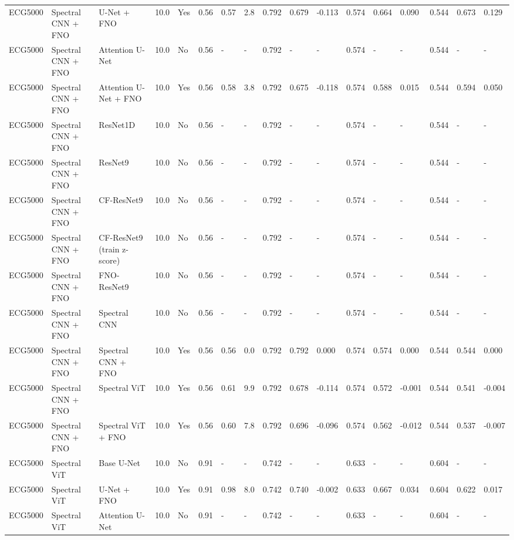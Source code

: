 \begin{longtable}{lllllllllllllllll}
ECG5000 & Spectral CNN + FNO & U-Net + FNO & 10.0 & Yes & 0.56 & 0.57 & 2.8 & 0.792 & 0.679 & -0.113 & 0.574 & 0.664 & 0.090 & 0.544 & 0.673 & 0.129 \\
ECG5000 & Spectral CNN + FNO & Attention U-Net & 10.0 & No & 0.56 & - & - & 0.792 & - & - & 0.574 & - & - & 0.544 & - & - \\
ECG5000 & Spectral CNN + FNO & Attention U-Net + FNO & 10.0 & Yes & 0.56 & 0.58 & 3.8 & 0.792 & 0.675 & -0.118 & 0.574 & 0.588 & 0.015 & 0.544 & 0.594 & 0.050 \\
ECG5000 & Spectral CNN + FNO & ResNet1D & 10.0 & No & 0.56 & - & - & 0.792 & - & - & 0.574 & - & - & 0.544 & - & - \\
ECG5000 & Spectral CNN + FNO & ResNet9 & 10.0 & No & 0.56 & - & - & 0.792 & - & - & 0.574 & - & - & 0.544 & - & - \\
ECG5000 & Spectral CNN + FNO & CF-ResNet9 & 10.0 & No & 0.56 & - & - & 0.792 & - & - & 0.574 & - & - & 0.544 & - & - \\
ECG5000 & Spectral CNN + FNO & CF-ResNet9 (train z-score) & 10.0 & No & 0.56 & - & - & 0.792 & - & - & 0.574 & - & - & 0.544 & - & - \\
ECG5000 & Spectral CNN + FNO & FNO-ResNet9 & 10.0 & No & 0.56 & - & - & 0.792 & - & - & 0.574 & - & - & 0.544 & - & - \\
ECG5000 & Spectral CNN + FNO & Spectral CNN & 10.0 & No & 0.56 & - & - & 0.792 & - & - & 0.574 & - & - & 0.544 & - & - \\
ECG5000 & Spectral CNN + FNO & Spectral CNN + FNO & 10.0 & Yes & 0.56 & 0.56 & 0.0 & 0.792 & 0.792 & 0.000 & 0.574 & 0.574 & 0.000 & 0.544 & 0.544 & 0.000 \\
ECG5000 & Spectral CNN + FNO & Spectral ViT & 10.0 & Yes & 0.56 & 0.61 & 9.9 & 0.792 & 0.678 & -0.114 & 0.574 & 0.572 & -0.001 & 0.544 & 0.541 & -0.004 \\
ECG5000 & Spectral CNN + FNO & Spectral ViT + FNO & 10.0 & Yes & 0.56 & 0.60 & 7.8 & 0.792 & 0.696 & -0.096 & 0.574 & 0.562 & -0.012 & 0.544 & 0.537 & -0.007 \\
ECG5000 & Spectral ViT & Base U-Net & 10.0 & No & 0.91 & - & - & 0.742 & - & - & 0.633 & - & - & 0.604 & - & - \\
ECG5000 & Spectral ViT & U-Net + FNO & 10.0 & Yes & 0.91 & 0.98 & 8.0 & 0.742 & 0.740 & -0.002 & 0.633 & 0.667 & 0.034 & 0.604 & 0.622 & 0.017 \\
ECG5000 & Spectral ViT & Attention U-Net & 10.0 & No & 0.91 & - & - & 0.742 & - & - & 0.633 & - & - & 0.604 & - & - \\

\end{longtable}
